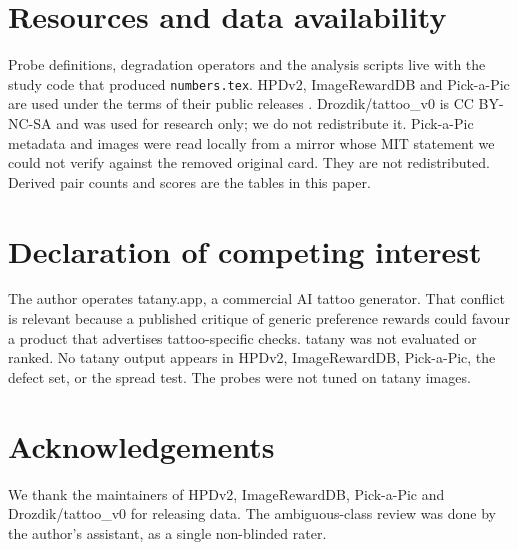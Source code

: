 \section*{Resources and data availability}
Probe definitions, degradation operators and the analysis scripts live with the study code that produced \texttt{numbers.tex}.
HPDv2, ImageRewardDB and Pick-a-Pic are used under the terms of their public releases \citep{wu2023hpsv2,xu2023imagereward,kirstain2023pickapic}.
Drozdik/tattoo\_v0 is CC BY-NC-SA and was used for research only; we do not redistribute it.
Pick-a-Pic metadata and images were read locally from a mirror whose MIT statement we could not verify against the removed original card.
They are not redistributed.
Derived pair counts and scores are the tables in this paper.

\section*{Declaration of competing interest}
\label{sec:coi}
The author operates tatany.app, a commercial AI tattoo generator.
That conflict is relevant because a published critique of generic preference rewards could favour a product that advertises tattoo-specific checks.
tatany was not evaluated or ranked.
No tatany output appears in HPDv2, ImageRewardDB, Pick-a-Pic, the defect set, or the spread test.
The probes were not tuned on tatany images.

\section*{Acknowledgements}
We thank the maintainers of HPDv2, ImageRewardDB, Pick-a-Pic and Drozdik/tattoo\_v0 for releasing data.
The ambiguous-class review was done by the author's assistant, as a single non-blinded rater.
